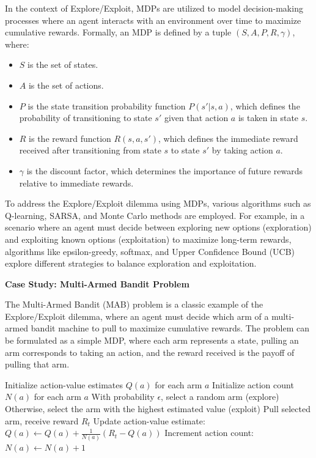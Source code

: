 \documentclass[12pt]{book} %
\begin{document}
In the context of Explore/Exploit, MDPs are utilized to model decision-making processes where an agent interacts with an environment over time to maximize cumulative rewards. Formally, an MDP is defined by a tuple $(S, A, P, R, \gamma)$, where:
\begin{itemize}
    \item $S$ is the set of states.
    \item $A$ is the set of actions.
    \item $P$ is the state transition probability function $P(s' | s, a)$, which defines the probability of transitioning to state $s'$ given that action $a$ is taken in state $s$.
    \item $R$ is the reward function $R(s, a, s')$, which defines the immediate reward received after transitioning from state $s$ to state $s'$ by taking action $a$.
    \item $\gamma$ is the discount factor, which determines the importance of future rewards relative to immediate rewards.
\end{itemize}

To address the Explore/Exploit dilemma using MDPs, various algorithms such as Q-learning, SARSA, and Monte Carlo methods are employed. For example, in a scenario where an agent must decide between exploring new options (exploration) and exploiting known options (exploitation) to maximize long-term rewards, algorithms like epsilon-greedy, softmax, and Upper Confidence Bound (UCB) explore different strategies to balance exploration and exploitation.

\textbf{Case Study: Multi-Armed Bandit Problem}

The Multi-Armed Bandit (MAB) problem is a classic example of the Explore/Exploit dilemma, where an agent must decide which arm of a multi-armed bandit machine to pull to maximize cumulative rewards. The problem can be formulated as a simple MDP, where each arm represents a state, pulling an arm corresponds to taking an action, and the reward received is the payoff of pulling that arm.
\FloatBarrier
\begin{algorithm}
\caption{Epsilon-Greedy Algorithm for Multi-Armed Bandit Problem}
\begin{algorithmic}[1]
\State Initialize action-value estimates $Q(a)$ for each arm $a$
\State Initialize action count $N(a)$ for each arm $a$
    \State With probability $\epsilon$, select a random arm (explore)
    \State Otherwise, select the arm with the highest estimated value (exploit)
    \State Pull selected arm, receive reward $R_t$
    \State Update action-value estimate: $Q(a) \gets Q(a) + \frac{1}{N(a)}(R_t - Q(a))$
    \State Increment action count: $N(a) \gets N(a) + 1$
\EndFor
\end{algorithmic}
\end{algorithm}
\FloatBarrier
\end{document}
